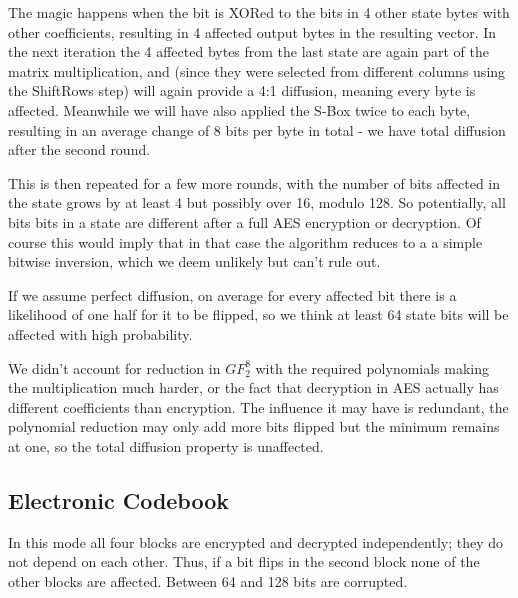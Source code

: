 \documentclass{article}
\begin{document}
The magic happens when the bit is XORed to the bits in 4 other state bytes with other coefficients, resulting in 4 affected output bytes in the resulting vector.
In the next iteration the 4 affected bytes from the last state are again part of the matrix multiplication, and (since they were selected from different columns using the ShiftRows step) will again provide a 4:1 diffusion, meaning every byte is affected.
Meanwhile we will have also applied the S-Box twice to each byte, resulting in an average change of 8 bits per byte in total - we have total diffusion after the second round.

This is then repeated for a few more rounds, with the number of bits affected in the state grows by at least 4 but possibly over 16, modulo 128.
So potentially, all bits bits in a state are different after a full AES encryption or decryption.
Of course this would imply that in that case the algorithm reduces to a a simple bitwise inversion, which we deem unlikely but can't rule out.

If we assume perfect diffusion, on average for every affected bit there is a likelihood of one half for it to be flipped, so we think at least 64 state bits will be affected with high probability.

We didn't account for reduction in $GF_2^8$ with the required polynomials making the multiplication much harder, or the fact that decryption in AES actually has different coefficients than encryption.
The influence it may have is redundant, the polynomial reduction may only add more bits flipped but the minimum remains at one, so the total diffusion property is unaffected.

\subsection{Electronic Codebook}
In this mode all four blocks are encrypted and decrypted independently; they do not depend on each other.
Thus, if a bit flips in the second block none of the other blocks are affected.
Between 64 and 128 bits are corrupted.

\end{document}
